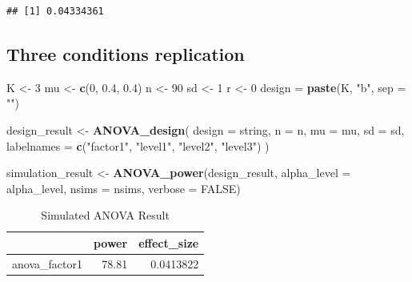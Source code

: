 \documentclass[]{book}
\newenvironment{Shaded}{\begin{snugshade}}{\end{snugshade}}
\newcommand{\DataTypeTok}[1]{\textcolor[rgb]{0.13,0.29,0.53}{#1}}
\newcommand{\DecValTok}[1]{\textcolor[rgb]{0.00,0.00,0.81}{#1}}
\newcommand{\FloatTok}[1]{\textcolor[rgb]{0.00,0.00,0.81}{#1}}
\newcommand{\KeywordTok}[1]{\textcolor[rgb]{0.13,0.29,0.53}{\textbf{#1}}}
\newcommand{\NormalTok}[1]{#1}
\newcommand{\OtherTok}[1]{\textcolor[rgb]{0.56,0.35,0.01}{#1}}
\newcommand{\StringTok}[1]{\textcolor[rgb]{0.31,0.60,0.02}{#1}}
\begin{document}
\begin{verbatim}
## [1] 0.04334361
\end{verbatim}

\hypertarget{three-conditions-replication}{%
\subsection{Three conditions replication}\label{three-conditions-replication}}

\begin{Shaded}
\begin{Highlighting}[]
\NormalTok{K <-}\StringTok{ }\DecValTok{3}
\NormalTok{mu <-}\StringTok{ }\KeywordTok{c}\NormalTok{(}\DecValTok{0}\NormalTok{, }\FloatTok{0.4}\NormalTok{, }\FloatTok{0.4}\NormalTok{)}
\NormalTok{n <-}\StringTok{ }\DecValTok{90}
\NormalTok{sd <-}\StringTok{ }\DecValTok{1}
\NormalTok{r <-}\StringTok{ }\DecValTok{0}
\NormalTok{design =}\StringTok{ }\KeywordTok{paste}\NormalTok{(K, }\StringTok{"b"}\NormalTok{, }\DataTypeTok{sep =} \StringTok{""}\NormalTok{)}
\end{Highlighting}
\end{Shaded}

\begin{Shaded}
\begin{Highlighting}[]
\NormalTok{design_result <-}\StringTok{ }\KeywordTok{ANOVA_design}\NormalTok{(}
  \DataTypeTok{design =}\NormalTok{ string,}
  \DataTypeTok{n =}\NormalTok{ n,}
  \DataTypeTok{mu =}\NormalTok{ mu,}
  \DataTypeTok{sd =}\NormalTok{ sd,}
  \DataTypeTok{labelnames =} \KeywordTok{c}\NormalTok{(}\StringTok{"factor1"}\NormalTok{, }\StringTok{"level1"}\NormalTok{, }\StringTok{"level2"}\NormalTok{, }\StringTok{"level3"}\NormalTok{)}
\NormalTok{  )}
\end{Highlighting}
\end{Shaded}

\begin{Shaded}
\begin{Highlighting}[]
\NormalTok{simulation_result <-}\StringTok{ }\KeywordTok{ANOVA_power}\NormalTok{(design_result, }
                                 \DataTypeTok{alpha_level =}\NormalTok{ alpha_level, }
                                 \DataTypeTok{nsims =}\NormalTok{ nsims,}
                                 \DataTypeTok{verbose =} \OtherTok{FALSE}\NormalTok{)}
\end{Highlighting}
\end{Shaded}

\begin{table}[t]

\caption{\label{tab:unnamed-chunk-53}Simulated ANOVA Result}
\centering
\begin{tabular}{l|r|r}
\hline
  & power & effect\_size\\
\hline
anova\_factor1 & 78.81 & 0.0413822\\
\hline
\end{tabular}
\end{table}
\end{document}
